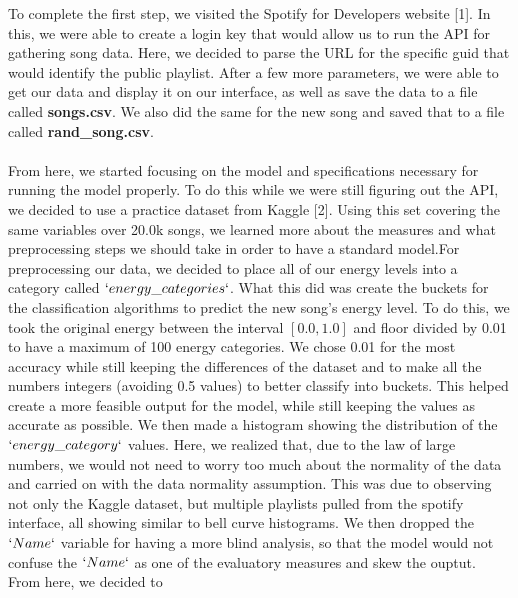 \documentclass[titlepage]{article}
\begin{document}
To complete the first step, we visited the Spotify for Developers website [1]. In this, we were able to create a login key that would allow us to run the API for gathering song data. Here, we decided to parse the URL for the specific guid that would identify the public playlist. After a few more parameters, we were able to get our data and display it on our interface, as well as save the data to a file called \textbf{songs.csv}. We also did the same for the new song and saved that to a file called \textbf{rand\_song.csv}.
\\\\
From here, we started focusing on the model and specifications necessary for running the model properly. To do this while we were still figuring out the API, we decided to use a practice dataset from Kaggle [2]. Using this set covering the same variables over 20.0k songs, we learned more about the measures and what preprocessing steps we should take in order to have a standard model.For preprocessing our data, we decided to place all of our energy levels into a category called $`energy\_categories`$. What this did was create the buckets for the classification algorithms to predict the new song's energy level. To do this, we took the original energy between the interval  $[0.0, 1.0]$ and floor divided by 0.01 to have a maximum of 100 energy categories. We chose 0.01 for the most accuracy while still keeping the differences of the dataset and to make all the numbers integers (avoiding 0.5 values) to better classify into buckets. This helped create a more feasible output for the model, while still keeping the values as accurate as possible. We then made a histogram showing the distribution of the $`energy\_category`$ values. Here, we realized that, due to the law of large numbers, we would not need to worry too much about the normality of the data and carried on with the data normality assumption. This was due to observing not only the Kaggle dataset, but multiple playlists pulled from the spotify interface, all showing similar to bell curve histograms. We then dropped the $`Name`$ variable for having a more blind analysis, so that the model would not confuse the $`Name`$ as one of the evaluatory measures and skew the ouptut. From here, we decided to 
\end{document}
